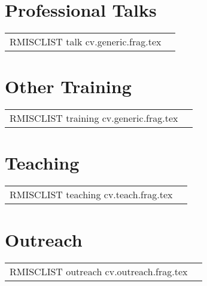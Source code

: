 \documentclass[letterpaper,11pt]{article}
\makeatletter
\newlength{\datewidth} \datewidth=14ex
\newlength{\descwidth} \descwidth=\textwidth
\newenvironment{mytable}{
  \begin{longtable}{@{}p{\datewidth}>{\raggedright}p{\descwidth}}
}{
  \end{longtable}
}
\makeatother
\begin{document}

\section*{Professional Talks}
\begin{mytable}
RMISCLIST talk cv.generic.frag.tex
\end{mytable}


\section*{Other Training}
\begin{mytable}
RMISCLIST training cv.generic.frag.tex
\end{mytable}

\section*{Teaching}
\begin{mytable}
RMISCLIST teaching cv.teach.frag.tex
\end{mytable}

\section*{Outreach}
\begin{mytable}
RMISCLIST outreach cv.outreach.frag.tex
\end{mytable}
\end{document}
